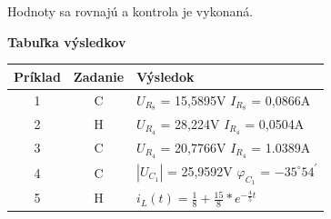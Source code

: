 \documentclass[a4paper,12pt]{article}
\begin{document}
\begin{center}
Hodnoty sa rovnajú a kontrola je vykonaná.
\end{center}


\newpage
\begin{flushleft}
\textbf{Tabuľka výsledkov}
\end{flushleft}

\bigskip

\begin{tabular}{|c|c|l|}
\hline
Príklad & Zadanie & Výsledok \\ \hline
1 & C & $U_{R_8}$ = 15,5895V \hspace{5mm} $I_{R_8}$ = 0,0866A \\ \hline
2 & H & $U_{R_4}$ = 28,224V \hspace{5mm} $I_{R_4}$ = 0,0504A \\ \hline
3 & C & $U_{R_4}$ = 20,7766V \hspace{2mm} $I_{R_4}$ = 1.0389A \\ \hline
4 & C & $|U_{C_1}|$ = 25,9592V  \hspace{4mm} $\varphi_{C_1}$ = $-35^{\circ}54^{\prime}$ \\ \hline
5 & H & $i_L(t) = \frac{1}{8} + \frac{15}{8}*e^{-\frac{4}{5}t}$ \\ \hline
\end{tabular}
\end{document}

